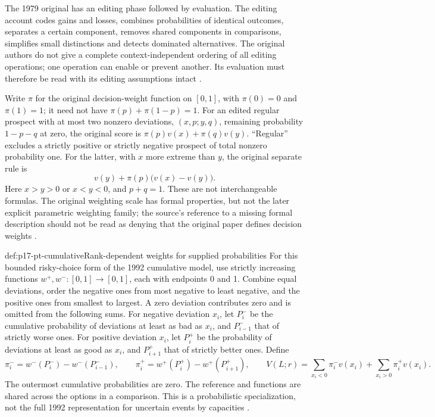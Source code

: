 The 1979 original has an editing phase followed by evaluation. The
editing account codes gains and losses, combines probabilities of
identical outcomes, separates a certain component, removes shared
components in comparisons, simplifies small distinctions and detects
dominated alternatives. The original authors do not give a complete
context-independent ordering of all editing operations; one operation
can enable or prevent another. Its evaluation must therefore be read
with its editing assumptions intact
\cite[pp.~274--275]{KahnemanTversky1979Prospect}.

Write \(\pi\) for the original decision-weight function on
\([0,1]\), with \(\pi(0)=0\) and \(\pi(1)=1\); it need not
have \(\pi(p)+\pi(1-p)=1\).
For an edited regular prospect with at most two nonzero deviations,
\((x,p;y,q)\), remaining probability \(1-p-q\) at zero, the original
score is \(\pi(p)v(x)+\pi(q)v(y)\). ``Regular'' excludes a
strictly positive or strictly negative prospect of total nonzero
probability one. For the latter, with \(x\) more extreme than
\(y\), the original separate rule is
\[
             v(y)+\pi(p)\bigl(v(x)-v(y)\bigr).
\]
Here \(x>y>0\) or \(x<y<0\), and \(p+q=1\).
These are not interchangeable formulas. The original weighting scale
has formal properties, but not the later explicit parametric weighting
family; the source's reference to a missing formal description should
not be read as denying that the original paper defines decision
weights \cite[pp.~275--276]{KahnemanTversky1979Prospect}
\cite[p.~488]{Glockner2021ProspectTheory}.

\begin{hbdefinition}{def:p17-pt-cumulative}{Rank-dependent weights for supplied probabilities}
For this bounded risky-choice form of the 1992 cumulative model, use
strictly increasing functions \(w^+,w^-:[0,1]\to[0,1]\), each
with endpoints 0 and 1. Combine equal deviations, order the negative
ones from most negative to least negative, and the positive ones
from smallest to largest. A zero deviation contributes zero and is
omitted from the following sums. For negative deviation \(x_i\),
let \(P_i^-\) be the cumulative probability of deviations at least
as bad as \(x_i\), and \(P_{i-1}^-\) that of strictly worse ones.
For positive deviation \(x_i\), let \(P_i^+\) be the probability
of deviations at least as good as \(x_i\), and \(P_{i+1}^+\) that
of strictly better ones. Define
\[
 \pi_i^-=w^-(P_i^-)-w^-(P_{i-1}^-),\qquad
 \pi_i^+=w^+(P_i^+)-w^+(P_{i+1}^+),
 \qquad
 V(L;r)=\sum_{x_i<0}\pi_i^-v(x_i)+\sum_{x_i>0}\pi_i^+v(x_i).
\]
The outermost cumulative probabilities are zero. The reference and
functions are shared across the options in a comparison. This is a
probabilistic specialization, not the full 1992 representation for
uncertain events by capacities \cite[pp.~299--301]{TverskyKahneman1992Cumulative}.
\end{hbdefinition}

